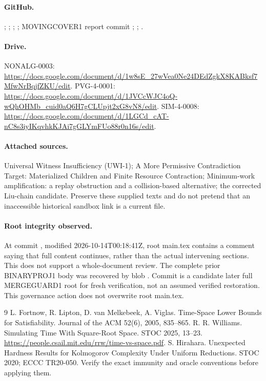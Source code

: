 \documentclass[11pt]{article}
\begin{document}
\paragraph{GitHub.}
; ;
;
;
MOVINGCOVER1 report commit ;
;
.
\paragraph{Drive.}
NONALG-0003: \url{https://docs.google.com/document/d/1w8sE_27wVea0Ne24DEdZgkX8KABksf7MfwNrBqjfZKU/edit}.
PVG-4-0001: \url{https://docs.google.com/document/d/1JVCcWJC4oQ-wQhOHMb_cuid0aQ6H7gCLUpjt2xG8vN8/edit}.
SIM-4-0008: \url{https://docs.google.com/document/d/1LGCd_cAT-nC8s3iyIKqvhkKJAi7gGLYmFUo88r0n16s/edit}.
\paragraph{Attached sources.}
Universal Witness Insufficiency (UWI-1); A More Permissive Contradiction Target: Materialized Children and Finite Resource Contraction; Minimum-work amplification: a replay obstruction and a collision-based alternative; the corrected Liu-chain candidate. Preserve these supplied texts and do not pretend that an inaccessible historical sandbox link is a current file.
\paragraph{Root integrity observed.}
At commit , modified 2026-10-14T00:18:41Z, root main.tex contains a comment saying that full content continues, rather than the actual intervening sections. This does not support a whole-document review. The complete prior BINARYPROJ1 body was recovered by blob . Commit  is a candidate later full MERGEGUARD1 root for fresh verification, not an assumed verified restoration. This governance action does not overwrite root main.tex.

\begin{thebibliography}{9}
 L. Fortnow, R. Lipton, D. van Melkebeek, A. Viglas. Time-Space Lower Bounds for Satisfiability. Journal of the ACM 52(6), 2005, 835--865.
 R. R. Williams. Simulating Time With Square-Root Space. STOC 2025, 13--23. \url{https://people.csail.mit.edu/rrw/time-vs-space.pdf}.
 S. Hirahara. Unexpected Hardness Results for Kolmogorov Complexity Under Uniform Reductions. STOC 2020; ECCC TR20-050. Verify the exact immunity and oracle conventions before applying them.
\end{thebibliography}
\end{document}
